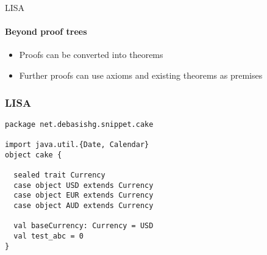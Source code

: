 
\begin{frame}{LISA}
\framesubtitle{Beyond proof trees}

\begin{itemize}
\item Proofs can be converted into theorems
\item Further proofs can use axioms and existing theorems as premises
\end{itemize}

\end{frame}


\begin{frame}[fragile]
\frametitle{LISA}

\begin{lstlisting}
package net.debasishg.snippet.cake

import java.util.{Date, Calendar}
object cake {

  sealed trait Currency
  case object USD extends Currency
  case object EUR extends Currency
  case object AUD extends Currency

  val baseCurrency: Currency = USD
  val test_abc = 0
}

\end{lstlisting}

\end{frame}
